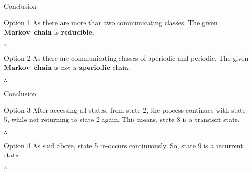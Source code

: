 \documentclass{beamer}
\begin{document}
\begin{frame}{Conclusion}
\begin{block}{Option 1}
As there are more than two communicating classes, The given \textbf{Markov\ chain} is \textbf{reducible}. \\
\begin{center}
  $\therefore$ 
\end{center}
\end{block}
\begin{block}{Option 2}
As there are communicating classes of aperiodic and periodic, The given \textbf{Markov\ chain} is not a \textbf{aperiodic} chain. \\
\begin{center}
  $\therefore$ 
\end{center}
\end{block}
\end{frame}
\begin{frame}{Conclusion}
\begin{block}{Option 3}
After accessing all states, from state 2, the process continues with state 5, while not returning to state 2 again. This means, state 8 is a transient state. \\
\begin{center}
  $\therefore$ 
\end{center}
\end{block}
\begin{block}{Option 4}
As said above, state 5 re-occurs continuously. So, state 9 is a recurrent state. \\
\begin{center}
  $\therefore$ 
\end{center}
\end{block}
\end{frame}
\end{document}
